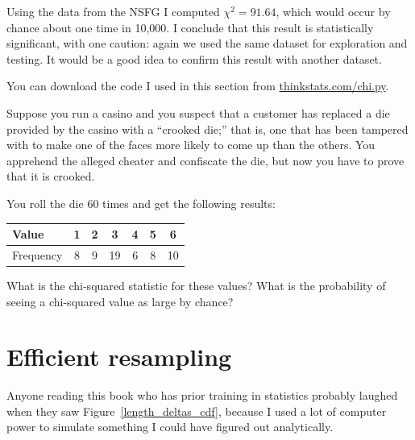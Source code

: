 \documentclass[12pt]{book}
\begin{document}

Using the data from the NSFG I computed $\chi^2 = 91.64$, which would
occur by chance about one time in 10,000.  I conclude that this result
is statistically significant, with one caution: again we used the
same dataset for exploration and testing.  It would be a good idea
to confirm this result with another dataset.


You can download the code I used in this section from
\url{thinkstats.com/chi.py}.




\begin{exercise}
Suppose you run a casino and you suspect that a customer has
replaced a die provided by the casino with a ``crooked die;'' that
is, one that has been tampered with to make one of the faces more
likely to come up than the others.  You apprehend the alleged
cheater and confiscate the die, but now you have to prove that it
is crooked.


You roll the die 60 times and get the following results:

\begin{center}
\begin{tabular}{|l|c|c|c|c|c|c|}
\hline
Value     &  1  &  2  &  3  &  4  &  5  &  6  \\ 
\hline
\hline
Frequency &  8  &  9  &  19  &  6  &  8  &  10  \\
\hline
\end{tabular}
\end{center}

What is the chi-squared statistic for these values?  What is the
probability of seeing a chi-squared value as large by chance?

\end{exercise}




\section{Efficient resampling}

Anyone reading this book who has prior training in statistics probably
laughed when they saw Figure~\ref{length_deltas_cdf}, because I used a
lot of computer power to simulate something I could have figured out
analytically.
\end{document}
